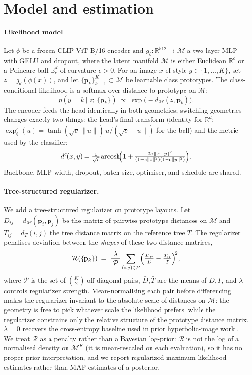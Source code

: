 \section{Model and estimation}
\label{sec:methods}

\paragraph{Likelihood model.} Let $\phi$ be a frozen CLIP ViT-B/16
encoder \citep{radford2021clip} and $g_\theta : \mathbb{R}^{512} \to
\mathcal{M}$ a two-layer MLP with GELU and dropout, where the latent
manifold $\mathcal{M}$ is either Euclidean $\mathbb{R}^d$ or a
Poincar\'e ball $\mathbb{B}^d_c$ of curvature $c > 0$. For an image
$x$ of style $y \in \{1, \ldots, K\}$, set $z = g_\theta(\phi(x))$,
and let $\{\mathbf{p}_k\}_{k=1}^K \subset \mathcal{M}$ be learnable
class prototypes. The class-conditional likelihood is a softmax over
distance to prototype on $\mathcal{M}$:
\[
  p(y = k \mid z;\, \{\mathbf{p}_k\})
    \;\propto\; \exp\!\bigl(-d_\mathcal{M}(z, \mathbf{p}_k)\bigr).
\]
The encoder feeds the head identically in both geometries; switching
geometries changes exactly two things: the head's final transform
(identity for $\mathbb{R}^d$; $\exp_0^c(u) = \tanh(\sqrt{c}\,\|u\|)\,
u/(\sqrt{c}\,\|u\|)$ for the ball) and the metric used by the
classifier:
\[
  d^c(x, y) = \tfrac{1}{\sqrt{c}}\operatorname{arcosh}\!\Bigl(
    1 + \tfrac{2c\,\|x-y\|^2}{(1-c\|x\|^2)(1-c\|y\|^2)}
  \Bigr).
\]
Backbone, MLP width, dropout, batch size, optimiser, and schedule
are shared.

\paragraph{Tree-structured regularizer.} We add a tree-structured
regularizer on prototype layouts. Let
$D_{ij} = d_\mathcal{M}(\mathbf{p}_i, \mathbf{p}_j)$ be the matrix of
pairwise prototype distances on $\mathcal{M}$ and
$T_{ij} = d_T(i, j)$ the tree distance matrix on the reference tree
$T$. The regularizer penalises deviation between the \emph{shapes} of
these two distance matrices,
\[
  \mathcal{R}(\{\mathbf{p}_k\}) \;=\;
    \frac{\lambda}{|\mathcal{P}|}
    \sum_{(i,j) \in \mathcal{P}}
    \Bigl(\tfrac{D_{ij}}{\bar{D}} - \tfrac{T_{ij}}{\bar{T}}\Bigr)^{\!2},
\]
where $\mathcal{P}$ is the set of $\binom{K}{2}$ off-diagonal pairs,
$\bar{D}, \bar{T}$ are the means of $D, T$, and $\lambda$ controls
regularizer strength. Mean-normalising each pair before differencing
makes the regularizer invariant to the absolute scale of distances on
$\mathcal{M}$: the geometry is free to pick whatever scale the
likelihood prefers, while the regularizer constrains only the
relative structure of the prototype distance matrix. $\lambda = 0$
recovers the cross-entropy baseline used in prior hyperbolic-image
work \citep{khrulkov2020hyperbolic}. We treat $\mathcal{R}$ as a
penalty rather than a Bayesian log-prior: $\mathcal{R}$ is not the
log of a normalised density on $\mathcal{M}^K$ (it is mean-rescaled
on each evaluation), so it has no proper-prior interpretation, and we
report regularized maximum-likelihood estimates rather than MAP
estimates of a posterior.

